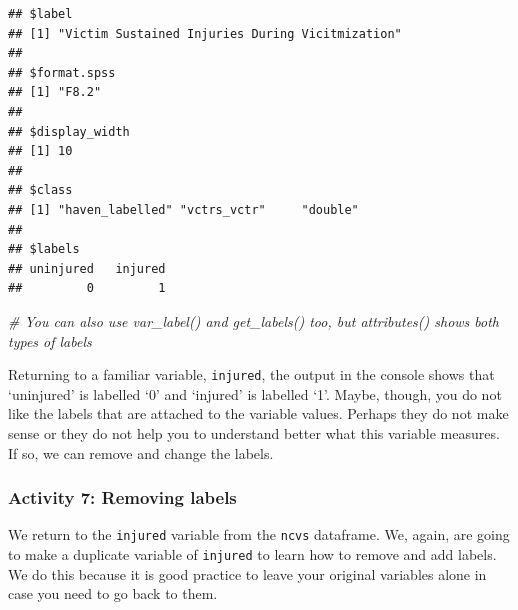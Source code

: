 \documentclass[
]{book}
\newenvironment{Shaded}{\begin{snugshade}}{\end{snugshade}}
\newcommand{\CommentTok}[1]{\textcolor[rgb]{0.56,0.35,0.01}{\textit{#1}}}
\newcommand{\FunctionTok}[1]{\textcolor[rgb]{0.00,0.00,0.00}{#1}}
\newcommand{\NormalTok}[1]{#1}
\newcommand{\OtherTok}[1]{\textcolor[rgb]{0.56,0.35,0.01}{#1}}
\newcommand{\SpecialCharTok}[1]{\textcolor[rgb]{0.00,0.00,0.00}{#1}}
\begin{document}
\begin{Shaded}
\end{Shaded}

\begin{verbatim}
## $label
## [1] "Victim Sustained Injuries During Vicitmization"
## 
## $format.spss
## [1] "F8.2"
## 
## $display_width
## [1] 10
## 
## $class
## [1] "haven_labelled" "vctrs_vctr"     "double"        
## 
## $labels
## uninjured   injured 
##         0         1
\end{verbatim}

\begin{Shaded}
\begin{Highlighting}[]
\CommentTok{\# You can also use var\_label() and get\_labels() too, but attributes() shows both types of labels}
\end{Highlighting}
\end{Shaded}

Returning to a familiar variable, \texttt{injured}, the output in the console shows that `uninjured' is labelled `0' and `injured' is labelled `1'. Maybe, though, you do not like the labels that are attached to the variable values. Perhaps they do not make sense or they do not help you to understand better what this variable measures. If so, we can remove and change the labels.

\hypertarget{activity-7-removing-labels}{%
\subsubsection{Activity 7: Removing labels}\label{activity-7-removing-labels}}

We return to the \texttt{injured} variable from the \texttt{ncvs} dataframe. We, again, are going to make a duplicate variable of \texttt{injured} to learn how to remove and add labels. We do this because it is good practice to leave your original variables alone in case you need to go back to them.

\begin{Shaded}
\end{Shaded}
\end{document}
